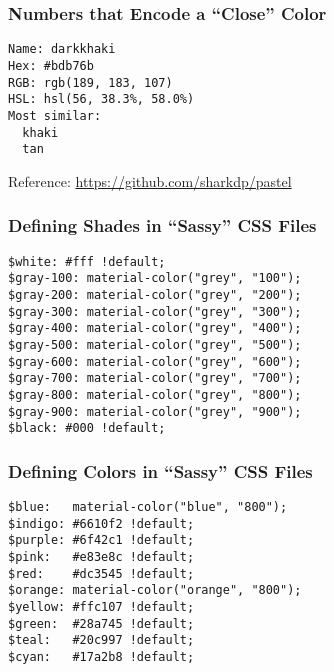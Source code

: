 \documentclass[14pt,aspectratio=169]{beamer}
\begin{document}
%
\begin{frame}[fragile]
  \frametitle{Numbers that Encode a ``Close'' Color}
  \normalsize
  \begin{minipage}{6in}
    \vspace*{.2in}
    \begin{verbatim}
Name: darkkhaki
Hex: #bdb76b
RGB: rgb(189, 183, 107)
HSL: hsl(56, 38.3%, 58.0%)
Most similar:
  khaki
  tan
    \end{verbatim}
  \end{minipage}
  \vspace*{.1in}
  \begin{center}
    Reference: \url{https://github.com/sharkdp/pastel}
  \end{center}
\end{frame}

%
\begin{frame}[fragile]
  \frametitle{Defining Shades in ``Sassy'' CSS Files}
  \normalsize
  \begin{minipage}{6in}
    \vspace*{.1in}
    \begin{verbatim}
$white: #fff !default;
$gray-100: material-color("grey", "100");
$gray-200: material-color("grey", "200");
$gray-300: material-color("grey", "300");
$gray-400: material-color("grey", "400");
$gray-500: material-color("grey", "500");
$gray-600: material-color("grey", "600");
$gray-700: material-color("grey", "700");
$gray-800: material-color("grey", "800");
$gray-900: material-color("grey", "900");
$black: #000 !default;
    \end{verbatim}
  \end{minipage}
\end{frame}

%
\begin{frame}[fragile]
  \frametitle{Defining Colors in ``Sassy'' CSS Files}
  \normalsize
  \begin{minipage}{6in}
    \vspace*{.1in}
    \begin{verbatim}
$blue:   material-color("blue", "800");
$indigo: #6610f2 !default;
$purple: #6f42c1 !default;
$pink:   #e83e8c !default;
$red:    #dc3545 !default;
$orange: material-color("orange", "800");
$yellow: #ffc107 !default;
$green:  #28a745 !default;
$teal:   #20c997 !default;
$cyan:   #17a2b8 !default;
    \end{verbatim}
  \end{minipage}
\end{frame}
\end{document}
